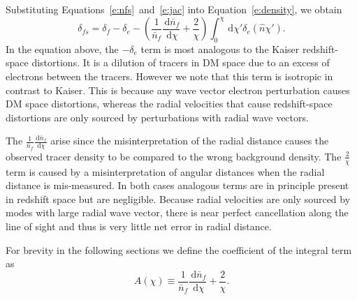 \documentclass[twocolumn,prl,nofootinbib,floatfix]{revtex4-1}
\makeatletter
\newcommand{\ud}{\,\mathrm{d}}
\def\ignorespacesandimplicitepars{%
  \begingroup
  \catcode13=10
  \@ifnextchar\relax
    {\endgroup}%
    {\endgroup}%
}
\renewcommand{\section}[1]{\emph{#1}---\ignorespacesandimplicitepars}
\makeatother
\begin{document}
Substituting Equations~\ref{e:nfs}~and~\ref{e:jac} into Equation~\ref{e:density},
we obtain
\begin{equation}
\label{e:delta_s}
    \delta_{fs} = \delta_f - \delta_e
    - \left(\frac{1}{\bar{n}_f}\frac{\ud \bar{n}_f}{\ud \chi}
    + \frac{2}{\chi} \right)
        \int_0^\chi \ud \chi' \delta_e(\hat n \chi').
\end{equation}
In the equation above, the $-\delta_e$ term is most analogous to the Kaiser
redshift-space distortions.  It is a dilution of tracers in DM space due to an
excess of electrons between the tracers. However we note that this term is isotropic
in contrast to Kaiser.  This is because any wave vector electron perturbation
causes DM space distortions, whereas the radial velocities that cause
redshift-space distortions are only sourced by perturbations with radial wave
vectors.

The $\frac{1}{\bar{n}_f}\frac{\ud \bar{n}_f}{\ud \chi}$ arise since the
misinterpretation of the radial distance causes the observed tracer density to
be compared to the wrong background density. The $\frac{2}{\chi}$ term is
caused by a misinterpretation of angular distances when the radial distance is
mis-measured.  In both cases analogous terms are in principle present in 
redshift space but are
negligible. Because radial velocities are only sourced by modes with large
radial wave vector, there is near perfect cancellation along the line of sight
and thus is very little net error in radial distance.

For brevity in the following sections we define the coefficient of the integral
term as
\begin{equation}
    \label{e:A}
    A(\chi) \equiv \frac{1}{\bar{n}_f}\frac{\ud \bar{n}_f}{\ud \chi}
    + \frac{2}{\chi}.
\end{equation}


\end{document}
